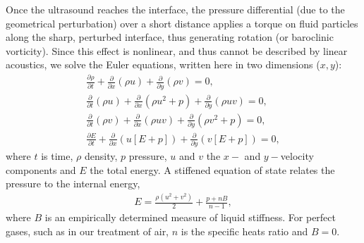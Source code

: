 \documentclass{jfm}%
\begin{document}
Once the ultrasound reaches the interface, the pressure differential
(due to the geometrical perturbation) over a short distance applies a
torque on fluid particles along the sharp, perturbed interface, thus
generating rotation (or baroclinic vorticity). Since this effect is
nonlinear, and thus cannot be described by linear acoustics, we solve
the Euler equations, written here in two dimensions ($x,y$):
\begin{subequations} \label{eq:euler}%
  \begin{align}%
    \frac{\partial \rho}{\partial t} + \frac{\partial}{\partial x}\left(\rho u\right) + \frac{\partial}{\partial y}\left(\rho v\right) = 0,\\
    \frac{\partial}{\partial t}\left(\rho u\right) + \frac{\partial}{\partial x}\left( \rho u^2+p\right)  + \frac{\partial}{\partial y}\left( \rho uv\right) = 0,\\
    \frac{\partial}{\partial t}\left(\rho v\right) + \frac{\partial}{\partial x}\left( \rho uv\right)  + \frac{\partial}{\partial y}\left( \rho v^2+p\right) = 0,\\
    \frac{\partial E}{\partial t} + \frac{\partial}{\partial x}\left(u\left[E+p\right]\right) + \frac{\partial}{\partial y}\left(v\left[E+p\right]\right) = 0,
  \end{align}%
\end{subequations}%
where $t$ is time, $\rho$ density, $p$ pressure, $u$ and $v$ the $x-$
and $y-$velocity components and $E$ the total energy. A stiffened
equation of state relates the pressure to the internal energy,
% 
\begin{align} \label{eq:stiffened_eos}%
  E=\frac{\rho\left(u^2+v^2\right)}{2} + \frac{p+n B}{n-1},
\end{align}
% 
where $B$ is an empirically determined measure of liquid
stiffness. For perfect gases, such as in our treatment of air, $n$ is
the specific heats ratio and $B=0$.
\end{document}
